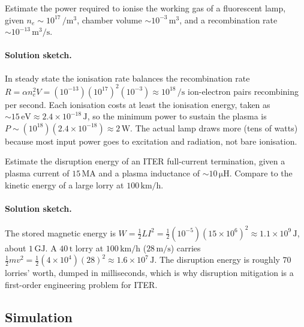 \begin{exercise}
Estimate the power required to ionise the working gas of a
fluorescent lamp, given $n_{e}\sim 10^{17}\,\si{\per\meter\cubed}$,
chamber volume $\sim 10^{-3}\,\si{\meter\cubed}$, and a
recombination rate $\sim 10^{-13}\,\si{\meter\cubed\per\second}$.
\paragraph{Solution sketch.} In steady state the ionisation rate balances
the recombination rate $R = \alpha n_{e}^{2}V = (10^{-13})(10^{17})^{2}
(10^{-3}) \approx 10^{18}\,\si{\per\second}$ ion-electron pairs recombining
per second. Each ionisation costs at least the ionisation energy, taken as
$\sim 15\,\si{\electronvolt}\approx 2.4\times 10^{-18}\,\si{\joule}$, so
the minimum power to sustain the plasma is $P\sim (10^{18})(2.4\times
10^{-18})\approx 2\,\si{\watt}$. The actual lamp draws more (tens of
watts) because most input power goes to excitation and radiation, not bare
ionisation.
\end{exercise}

\begin{exercise}
Estimate the disruption energy of an ITER full-current termination,
given a plasma current of $15\,\si{\mega\ampere}$ and a plasma
inductance of $\sim 10\,\si{\micro\henry}$. Compare to the kinetic
energy of a large lorry at $100\,\si{\kilo\meter\per\hour}$.
\paragraph{Solution sketch.} The stored magnetic energy is $W = \tfrac12
LI^{2} = \tfrac12(10^{-5})(15\times 10^{6})^{2} \approx 1.1\times
10^{9}\,\si{\joule}$, about $1\,\si{\giga\joule}$. A $40\,\si{\tonne}$
lorry at $100\,\si{\kilo\meter\per\hour}$ ($28\,\si{\meter\per\second}$)
carries $\tfrac12 m v^{2} = \tfrac12(4\times 10^{4})(28)^{2} \approx
1.6\times 10^{7}\,\si{\joule}$. The disruption energy is roughly $70$
lorries' worth, dumped in milliseconds, which is why disruption mitigation
is a first-order engineering problem for ITER.
\end{exercise}

\subsection*{Simulation}

